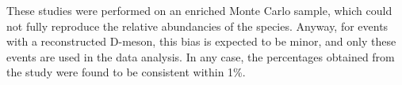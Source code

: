 These studies were performed on an enriched Monte Carlo sample, which could not fully reproduce the relative abundancies of the species. Anyway, for events with a reconstructed D-meson, this bias is expected to be minor, and only these events are used in the data analysis. In any case, the percentages obtained from the study were found to be consistent within 1\%.

\clearpage
%
